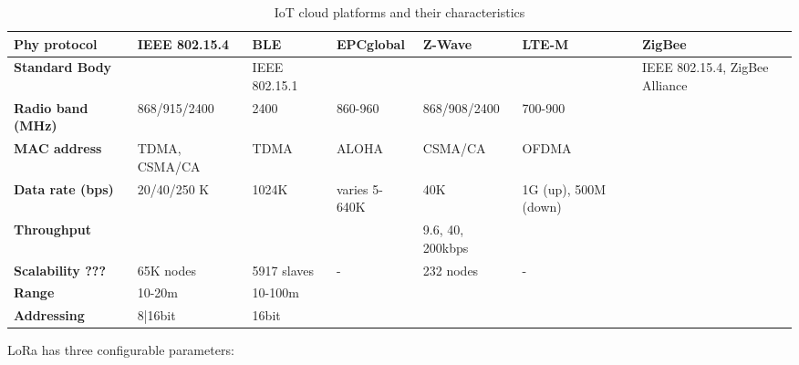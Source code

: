 \begin{table}[h!]
\scriptsize
	\begin{tabulary}{\textwidth}{L|L|L|L|L|L|L}
	\bf{Phy protocol}     & \bf{IEEE 802.15.4} & \bf{BLE}      & \bf{EPCglobal} & \bf{Z-Wave}              & \bf{LTE-M}           & \bf{ZigBee} \\\hline
	\bf{Standard Body}    &                    & IEEE 802.15.1 &                &                          &                      & IEEE 802.15.4, ZigBee Alliance \\\hline
	\bf{Radio band (MHz)} & 868/915/2400       & 2400          & 860-960        & 868/908/2400             & 700-900              & \\\hline
	\bf{MAC address}      & TDMA, CSMA/CA      & TDMA          & ALOHA          & CSMA/CA                  & OFDMA                & \\\hline
	\bf{Data rate (bps)}  & 20/40/250 K        & 1024K         & varies 5-640K  & 40K                      & 1G (up), 500M (down) & \\\hline
	\bf{Throughput}       &                    &               &                & 9.6, 40, 200kbps         &                      & \\\hline
	\bf{Scalability ???}  & 65K nodes          & 5917 slaves   & -              & 232 nodes                & -                    & \\\hline
	\bf{Range}            & 10-20m             & 10-100m       &                &                          &                      & \\\hline
	\bf{Addressing}       & 8|16bit            & 16bit         &                &                          &                      & \\\hline
	\end{tabulary}
	\caption{\label{tab:IoT_cloud} IoT cloud platforms and their characteristics \cite{al-fuqaha_internet_24}}
\end{table}


LoRa has three configurable parameters:

